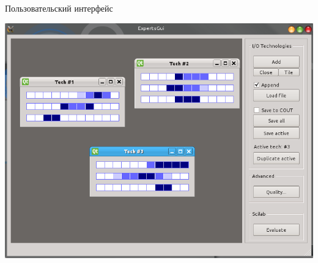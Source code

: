 \begin{frame}{Пользовательский интерфейс}
          \begin{center}
	      \includegraphics[width=0.75\linewidth]{./pic/combination6}
	  \end{center}
\end{frame} %
